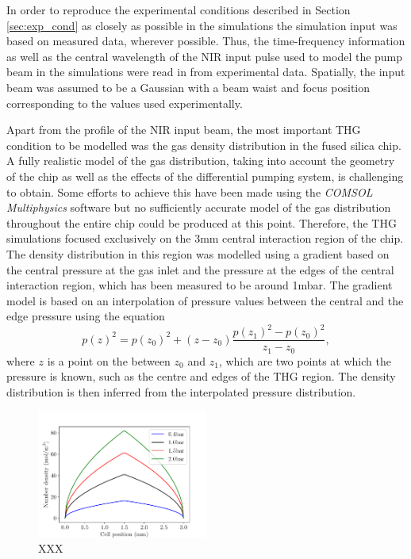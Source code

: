 \documentclass[a4paper]{jpconf}
\begin{document}
In order to reproduce the experimental conditions described in Section \ref{sec:exp_cond} as closely as possible in the simulations the simulation input was based on measured data, wherever possible. Thus, the time-frequency information as well as the central wavelength of the NIR input pulse used to model the pump beam in the simulations were read in from experimental data. Spatially, the input beam was assumed to be a Gaussian with a beam waist and focus position corresponding to the values used experimentally. \par 
Apart from the profile of the NIR input beam, the most important THG condition to be modelled was the gas density distribution in the fused silica chip. A fully realistic model of the gas distribution, taking into account the geometry of the chip as well as the effects of the differential pumping system, is challenging to obtain. Some efforts to achieve this have been made using the \textit{COMSOL Multiphysics} software but no sufficiently accurate model of the gas distribution throughout the entire chip could be produced at this point. Therefore, the THG simulations focused exclusively on the 3mm central interaction region of the chip. The density distribution in this region was modelled using a gradient based on the central pressure at the gas inlet and the pressure at the edges of the central interaction region, which has been measured to be around 1mbar. The gradient model is based on an interpolation of pressure values between the central and the edge pressure using the equation 
\begin{equation}
p(z)^2 = p(z_0)^2 + (z-z_0) \frac{p(z_1)^2 - p(z_0)^2}{z_1 - z_0}, 
\end{equation}
where $z$ is a point on the between $z_0$ and $z_1$, which are two points at which the pressure is known, such as the centre and edges of the THG region. The density distribution is then inferred from the interpolated pressure distribution. \par 
\begin{figure}[h]
\centering
\includegraphics[width=0.5\textwidth]{im/grad_model}
\caption{XXX}\label{im:grad}
\end{figure} 
\end{document}
